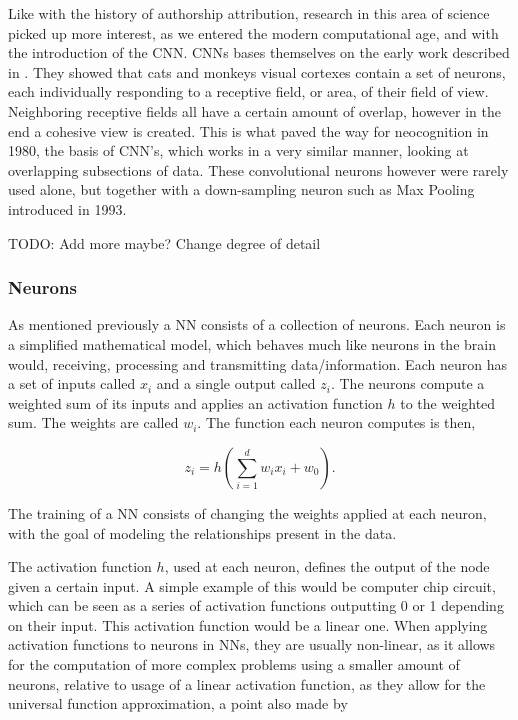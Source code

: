 Like with the history of authorship attribution, research in this area of
science picked up more interest, as we entered the modern computational age,
and with the introduction of the \gls{CNN}. \gls{CNN}s bases themselves on
the early work described in \cite{TJP:TJP19681951215}. They showed that cats
and monkeys visual cortexes contain a set of neurons, each individually
responding to a receptive field, or area, of their field of view. Neighboring
receptive fields all have a certain amount of overlap, however in the end
a cohesive view is created. This is what paved the way for neocognition in
1980\cite{Fukushima1980}, the basis of \gls{CNN}'s, which works in a very
similar manner, looking at overlapping subsections of data. These convolutional
neurons however were rarely used alone, but together with a down-sampling neuron
such as Max Pooling introduced in 1993.\cite{Schmidhuber:2015}

TODO: Add more maybe? Change degree of detail

\subsubsection{Neurons}

As mentioned previously a \gls{NN} consists of a collection of neurons. Each
neuron is a simplified mathematical model, which behaves much like neurons in
the brain would, receiving, processing and transmitting data/information. Each
neuron has a set of inputs called $x_i$ and a single output called $z_i$. The
neurons compute a weighted sum of its inputs and applies an activation function
$h$ to the weighted sum. The weights are called $w_i$. The function each neuron
computes is then,

\begin{equation}
    z_i = h\left(
        \sum_{i = 1}^d w_ix_i + w_0
    \right).
\end{equation}

The training of a \gls{NN} consists of changing the weights applied at each
neuron, with the goal of modeling the relationships present in the data.

The activation function $h$, used at each neuron, defines the output of the
node given a certain input. A simple example of this would be computer chip
circuit, which can be seen as a series of activation functions outputting 0 or
1 depending on their input. This activation function would be a linear one.
When applying activation functions to neurons in \gls{NN}s, they are usually
non-linear, as it allows for the computation of more complex problems using a
smaller amount of neurons, relative to usage of a linear activation function,
as they allow for the universal function approximation, a point also made by
\cite{6797088}

